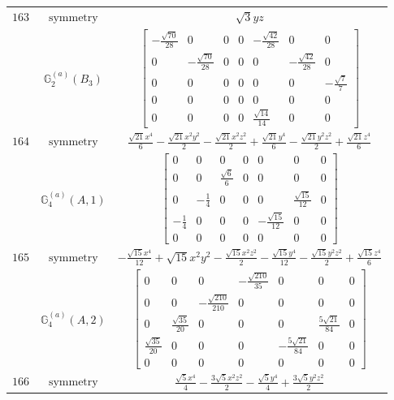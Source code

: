 \documentclass[fleqn,8pt,landscape]{jsarticle}
\begin{document}
\begin{longtable}{ccc}
$ 163 $ & $ \text{symmetry} $ & $ \sqrt{3} y z $ \\
$  $ & $ \mathbb{G}_{2}^{(a)}(B_{3}) $ & $ \begin{bmatrix} - \frac{\sqrt{70}}{28} & 0 & 0 & 0 & - \frac{\sqrt{42}}{28} & 0 & 0 \\ 0 & - \frac{\sqrt{70}}{28} & 0 & 0 & 0 & - \frac{\sqrt{42}}{28} & 0 \\ 0 & 0 & 0 & 0 & 0 & 0 & - \frac{\sqrt{7}}{7} \\ 0 & 0 & 0 & 0 & 0 & 0 & 0 \\ 0 & 0 & 0 & 0 & \frac{\sqrt{14}}{14} & 0 & 0 \end{bmatrix} $ \\ \hline
$ 164 $ & $ \text{symmetry} $ & $ \frac{\sqrt{21} x^{4}}{6} - \frac{\sqrt{21} x^{2} y^{2}}{2} - \frac{\sqrt{21} x^{2} z^{2}}{2} + \frac{\sqrt{21} y^{4}}{6} - \frac{\sqrt{21} y^{2} z^{2}}{2} + \frac{\sqrt{21} z^{4}}{6} $ \\
$  $ & $ \mathbb{G}_{4}^{(a)}(A,1) $ & $ \begin{bmatrix} 0 & 0 & 0 & 0 & 0 & 0 & 0 \\ 0 & 0 & \frac{\sqrt{6}}{6} & 0 & 0 & 0 & 0 \\ 0 & - \frac{1}{4} & 0 & 0 & 0 & \frac{\sqrt{15}}{12} & 0 \\ - \frac{1}{4} & 0 & 0 & 0 & - \frac{\sqrt{15}}{12} & 0 & 0 \\ 0 & 0 & 0 & 0 & 0 & 0 & 0 \end{bmatrix} $ \\ \hline
$ 165 $ & $ \text{symmetry} $ & $ - \frac{\sqrt{15} x^{4}}{12} + \sqrt{15} x^{2} y^{2} - \frac{\sqrt{15} x^{2} z^{2}}{2} - \frac{\sqrt{15} y^{4}}{12} - \frac{\sqrt{15} y^{2} z^{2}}{2} + \frac{\sqrt{15} z^{4}}{6} $ \\
$  $ & $ \mathbb{G}_{4}^{(a)}(A,2) $ & $ \begin{bmatrix} 0 & 0 & 0 & - \frac{\sqrt{210}}{35} & 0 & 0 & 0 \\ 0 & 0 & - \frac{\sqrt{210}}{210} & 0 & 0 & 0 & 0 \\ 0 & \frac{\sqrt{35}}{20} & 0 & 0 & 0 & \frac{5 \sqrt{21}}{84} & 0 \\ \frac{\sqrt{35}}{20} & 0 & 0 & 0 & - \frac{5 \sqrt{21}}{84} & 0 & 0 \\ 0 & 0 & 0 & 0 & 0 & 0 & 0 \end{bmatrix} $ \\ \hline
$ 166 $ & $ \text{symmetry} $ & $ \frac{\sqrt{5} x^{4}}{4} - \frac{3 \sqrt{5} x^{2} z^{2}}{2} - \frac{\sqrt{5} y^{4}}{4} + \frac{3 \sqrt{5} y^{2} z^{2}}{2} $ \\

\end{longtable}
\end{document}
